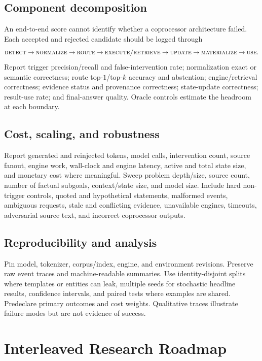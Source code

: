 \documentclass[11pt]{article}
\begin{document}
\subsection{Component decomposition}

An end-to-end score cannot identify whether a coprocessor architecture failed.
Each accepted and rejected candidate should be logged through
\[
\textsc{detect}\rightarrow\textsc{normalize}\rightarrow\textsc{route}
\rightarrow\textsc{execute/retrieve}\rightarrow\textsc{update}
\rightarrow\textsc{materialize}\rightarrow\textsc{use}.
\]
Report trigger precision/recall and false-intervention rate; normalization exact
or semantic correctness; route top-$1$/top-$k$ accuracy and abstention;
engine/retrieval correctness; evidence status and provenance correctness;
state-update correctness; result-use rate; and final-answer quality.  Oracle
controls estimate the headroom at each boundary.

\subsection{Cost, scaling, and robustness}

Report generated and reinjected tokens, model calls, intervention count, source
fanout, engine work, wall-clock and engine latency, active and total state size,
and monetary cost where meaningful.  Sweep problem depth/size, source count,
number of factual subgoals, context/state size, and model size.  Include hard
non-trigger controls, quoted and hypothetical statements, malformed events,
ambiguous requests, stale and conflicting evidence, unavailable engines,
timeouts, adversarial source text, and incorrect coprocessor outputs.

\subsection{Reproducibility and analysis}

Pin model, tokenizer, corpus/index, engine, and environment revisions.  Preserve
raw event traces and machine-readable summaries.  Use identity-disjoint splits
where templates or entities can leak, multiple seeds for stochastic headline
results, confidence intervals, and paired tests where examples are shared.
Predeclare primary outcomes and cost weights.  Qualitative traces illustrate
failure modes but are not evidence of success.

\section{Interleaved Research Roadmap}
\end{document}
